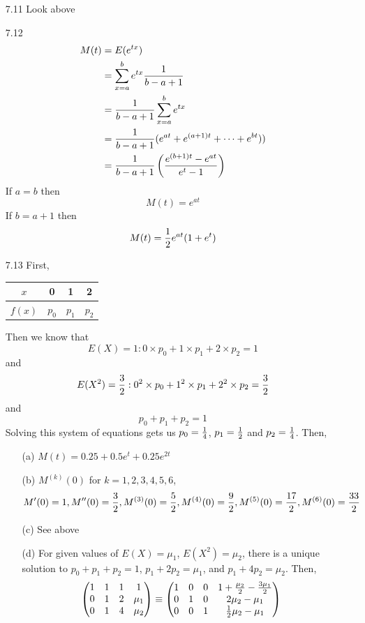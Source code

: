 \documentclass[english, 11pt]{article}
\begin{document}
\begin{itemize}
  \item[7.11] Look above

  \item[7.12]
  \begin{align*}
    M(t) & = E(e^{tx}) \\
      & = \sum_{x = a}^b e^{tx} \frac{1}{b-a+1} \\
      & = \frac{1}{b-a+1} \sum_{x=a}^b e^{tx} \\
      & = \frac{1}{b-a+1} (e^{at} + e^{(a+1)t} + \cdots + e^{bt})) \\
      & = \frac{1}{b-a+1} \left( \frac{e^{(b+1)t} - e^{at}}{e^t - 1} \right)
  \end{align*}
  If $a = b$ then
  \[ M(t) = e^{at} \]
  If $b = a + 1$ then
  \[ M(t) = \frac{1}{2}e^{at}(1 + e^t) \]

\newcommand{\mtx}[1]{\left( \begin{matrix}
  #1
\end{matrix} \right)}

  \item[7.13] First,
  \begin{tabular}{c | c c c}
  $x$ & 0 & 1 & 2 \\
  \hline
  $f(x)$ & $p_0$ & $p_1$ & $p_2$
  \end{tabular}
  Then we know that
    \[ E(X) = 1: 0\times p_0 + 1\times p_1 + 2 \times p_2 = 1 \] and
    \[ E(X^2) = \frac{3}{2}: 0^2\times p_0 + 1^2 \times p_1 + 2^2 \times p_2 = \frac{3}{2}\] and
    \[ p_0 + p_1 + p_2 = 1 \]
    Solving this system of equations gets us $p_0 = \frac{1}{4}$, $p_1 = \frac{1}{2}$ and $p_2 = \frac{1}{4}$. Then,
    \begin{itemize}
      \item[(a)] $M(t) = 0.25 + 0.5e^t + 0.25e^{2t}$
      \item[(b)] $M^{(k)}(0)$ for $k = 1,2,3,4,5,6$,
      \[ M'(0) = 1, M''(0) = \frac{3}{2}, M^{(3)}(0) = \frac{5}{2}, M^{(4)}(0) = \frac{9}{2}, M^{(5)}(0) = \frac{17}{2}, M^{(6)}(0) = \frac{33}{2} \]
      \item[(c)] See above
      \item[(d)] For given values of $E(X) = \mu_1$, $E(X^2) = \mu_2$, there is a unique solution to $p_0 + p_1 + p_2 = 1$, $p_1 + 2p_2 = \mu_1$, and $p_1 + 4p_2 = \mu_2$. Then,
      \begin{align*}
        \mtx{1 & 1 & 1 & 1 \\ 0 & 1 & 2 & \mu_1 \\ 0 & 1 & 4 & \mu_2} \equiv \mtx{1 & 0 & 0 & 1 + \f{\mu_2}{2} - \f{3\mu_1}{2} \\ 0 & 1 & 0 & 2\mu_2 - \mu_1 \\ 0 & 0 & 1 & \f{1}{2}\mu_2 -\mu_1}
      \end{align*}
    \end{itemize}


  \end{itemize}
\end{document}
